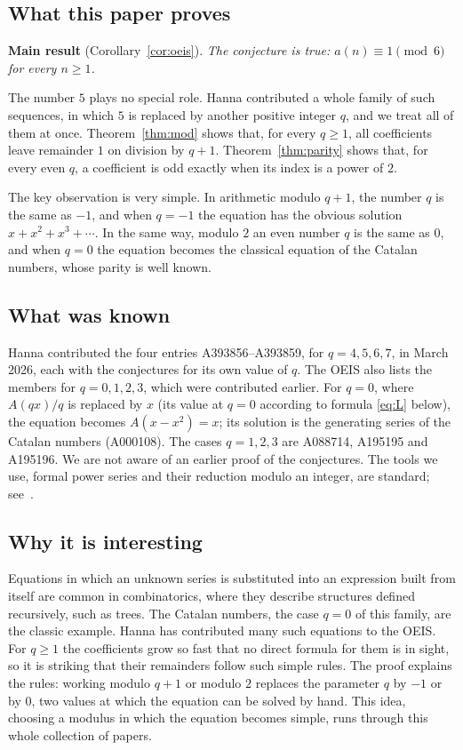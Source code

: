 \documentclass[11pt,a4paper]{article}
\theoremstyle{definition}
\theoremstyle{remark}
\begin{document}
\subsection{What this paper proves}
\textbf{Main result} (Corollary~\ref{cor:oeis}). \emph{The conjecture is true: $a(n)\equiv1\pmod{6}$ for every $n\ge1$.}

The number $5$ plays no special role. Hanna contributed a whole family of such sequences, in which
$5$ is replaced by another positive integer $q$, and we treat all of them at once.
Theorem~\ref{thm:mod} shows that, for every $q\ge1$, all coefficients leave remainder $1$ on division by $q+1$.
Theorem~\ref{thm:parity} shows that, for every even $q$, a coefficient is odd exactly when its index is a power of $2$.

The key observation is very simple. In arithmetic modulo $q+1$, the number $q$ is the same as $-1$, and when $q=-1$ the
equation has the obvious solution $x+x^2+x^3+\cdots$. In the same way, modulo $2$ an even number $q$ is the same as $0$,
and when $q=0$ the equation becomes the classical equation of the Catalan numbers, whose parity is well known.

\subsection{What was known}
Hanna contributed the four entries A393856--A393859, for $q=4,5,6,7$, in March 2026, each with the conjectures for its
own value of $q$. The OEIS also lists the members for $q=0,1,2,3$, which were contributed earlier. For $q=0$, where
$A(qx)/q$ is replaced by $x$ (its value at $q=0$ according to formula \eqref{eq:L} below), the equation becomes
$A(x-x^2)=x$; its solution is the generating series of the Catalan numbers (A000108). The cases $q=1,2,3$ are
A088714, A195195 and A195196. We are not aware of an earlier proof of the conjectures. The tools we use, formal power
series and their reduction modulo an integer, are standard; see~\cite{niven,stanley}.

\subsection{Why it is interesting}
Equations in which an unknown series is substituted into an expression built from itself are common in
combinatorics, where they describe structures defined recursively, such as trees. The Catalan numbers, the case $q=0$
of this family, are the classic example. Hanna has contributed many such equations to the OEIS. For $q\ge1$ the
coefficients grow so fast that no direct formula for them is in sight, so it is striking that their remainders follow
such simple rules. The proof explains the rules: working modulo $q+1$ or modulo $2$ replaces the parameter $q$ by $-1$
or by $0$, two values at which the equation can be solved by hand. This idea, choosing a modulus in which the equation
becomes simple, runs through this whole collection of papers.
\end{document}
